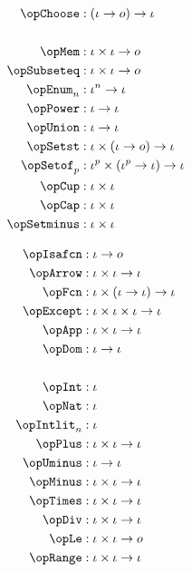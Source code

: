 \documentclass[11pt, a4paper, oneside]{article}
\begin{document}
\begin{minipage}[t]{.5\textwidth}
    \begin{align*}
        \opChoose       &: (\idv \arr o) \arr \idv \\
        \\
        \opMem          &: \idv \times \idv \arr o \\
        \opSubseteq     &: \idv \times \idv \arr o \\
        \opEnum_n       &: \idv^n \arr \idv \\
        \opPower        &: \idv \arr \idv \\
        \opUnion        &: \idv \arr \idv \\
        \opSetst        &: \idv \times (\idv \arr o) \arr \idv \\
        \opSetof_p      &: \idv^p \times (\idv^p \arr \idv) \arr \idv \\
        \opCup          &: \idv \times \idv \\
        \opCap          &: \idv \times \idv \\
        \opSetminus     &: \idv \times \idv
    \end{align*}
\end{minipage}%
\begin{minipage}[t]{.5\textwidth}
    \begin{align*}
        \opIsafcn       &: \idv \arr o \\
        \opArrow        &: \idv \times \idv \arr \idv \\
        \opFcn          &: \idv \times (\idv \arr \idv) \arr \idv \\
        \opExcept       &: \idv \times \idv \times \idv \arr \idv \\
        \opApp          &: \idv \times \idv \arr \idv \\
        \opDom          &: \idv \arr \idv \\
        \\
        \opInt          &: \idv \\
        \opNat          &: \idv \\
        \opIntlit_n     &: \idv \\
        \opPlus         &: \idv \times \idv \arr \idv \\
        \opUminus       &: \idv \arr \idv \\
        \opMinus        &: \idv \times \idv \arr \idv \\
        \opTimes        &: \idv \times \idv \arr \idv \\
        \opDiv          &: \idv \times \idv \arr \idv \\
        \opLe           &: \idv \times \idv \arr o \\
        \opRange        &: \idv \times \idv \arr \idv
    \end{align*}
\end{minipage}
\end{document}
